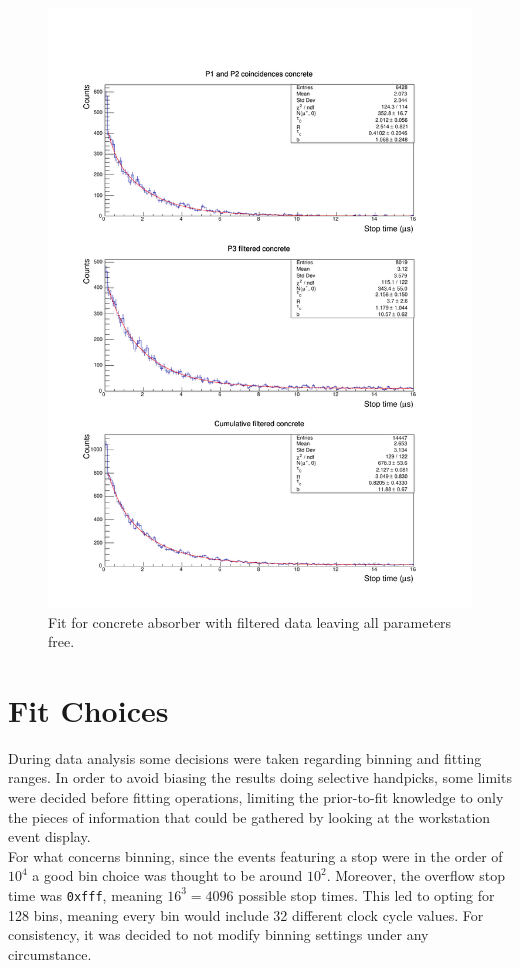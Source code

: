 \documentclass[../main.tex]{subfiles}
\begin{document}
    \begin{figure}[htb!]
         \centering
         \includegraphics[width=0.9\linewidth]{images/1_over_r_concrete_fit.pdf}
         \caption{Fit for concrete absorber with filtered data leaving all parameters free.}
         \label{fig:allFreeConcrete}
     \end{figure}
\FloatBarrier
\section{Fit Choices}
During data analysis some decisions were taken regarding binning and fitting ranges. In order to avoid biasing the results doing selective handpicks, some limits were decided before fitting operations, limiting the prior-to-fit knowledge to only the pieces of information that could be gathered by looking at the workstation event display.\\

For what concerns binning, since the events featuring a stop were in the order of $10^4$ a good bin choice was thought to be around $10^2$. Moreover, the overflow stop time was \texttt{0xfff}, meaning $16^3=4096$ possible stop times. This led to opting for 128 bins, meaning every bin would include 32 different clock cycle values. For consistency, it was decided to not modify binning settings under any circumstance.\\
\end{document}
